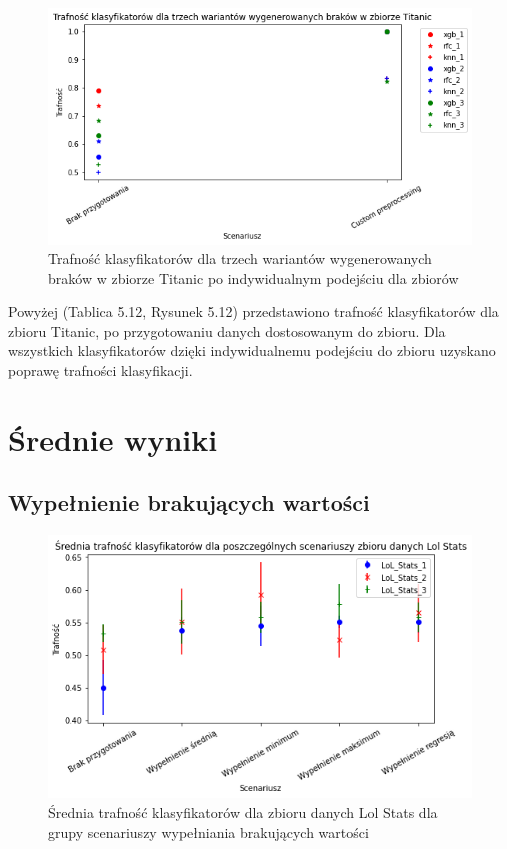 \documentclass{book}
\begin{document}
\begin{figure}[H]
    \centerline{\includegraphics[scale=0.8]{Titanic_Custom}}
    \centering
    \caption{Trafność klasyfikatorów dla trzech wariantów wygenerowanych braków w zbiorze Titanic po indywidualnym podejściu dla zbiorów}
    \end{figure}


Powyżej (Tablica 5.12, Rysunek 5.12) przedstawiono 
trafność klasyfikatorów dla zbioru Titanic, 
po przygotowaniu danych dostosowanym do zbioru.
Dla wszystkich klasyfikatorów dzięki indywidualnemu podejściu
do zbioru uzyskano poprawę trafności klasyfikacji.

\section{Średnie wyniki}

\subsection{Wypełnienie brakujących wartości}

\begin{figure}[H]
    \centerline{\includegraphics[scale=0.8]{Lol_Stats_Avg_Wypełnienie_brakujących}}
    \centering
    \caption{Średnia trafność klasyfikatorów dla zbioru danych Lol Stats 
    dla grupy scenariuszy wypełniania brakujących wartości}
    \end{figure}
\end{document}
